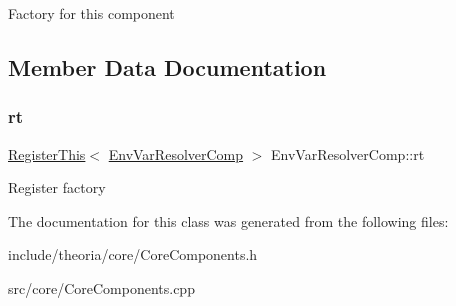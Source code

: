 Factory for this component 

\subsection{Member Data Documentation}
\mbox{\label{classtheoria_1_1core_1_1EnvVarResolverComp_a77207c81c25bf8870f3fe06524cae63a}} 
\subsubsection{\texorpdfstring{rt}{rt}}
{\footnotesize\ttfamily \hyperlink{classtheoria_1_1core_1_1RegisterThis}{Register\+This}$<$ \hyperlink{classtheoria_1_1core_1_1EnvVarResolverComp}{Env\+Var\+Resolver\+Comp} $>$ Env\+Var\+Resolver\+Comp\+::rt\hspace{0.3cm}{\ttfamily [static]}}

Register factory 

The documentation for this class was generated from the following files\+:\begin{DoxyCompactItemize}
\item 
include/theoria/core/Core\+Components.\+h\item 
src/core/Core\+Components.\+cpp\end{DoxyCompactItemize}
